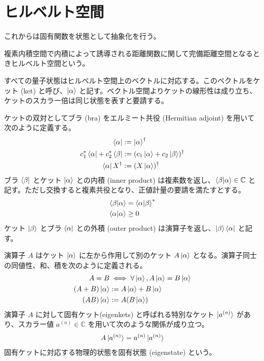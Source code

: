 \documentclass[uplatex,dvipdfmx,a4paper,11pt]{jlreq}
\newcommand{\CC}{\mathbb{C}}
\theoremstyle{definition}
\begin{document}
\section{ヒルベルト空間}
これからは固有関数を状態として抽象化を行う。
\begin{definition}
  複素内積空間で内積によって誘導される距離関数に関して完備距離空間となるときヒルベルト空間という。
\end{definition}
\begin{definition}[ブラケット]
  すべての量子状態はヒルベルト空間上のベクトルに対応する。このベクトルをケット (ket) と呼び、$\ket{\alpha}$ と記す。ベクトル空間よりケットの線形性は成り立ち、ケットのスカラー倍は同じ状態を表すと要請する。

  ケットの双対としてブラ (bra) をエルミート共役 (Hermitian adjoint) を用いて次のように定義する。
  \begin{align}
    \bra{\alpha}                         & := \ket{\alpha}^\dagger                       \\
    c_1^*\bra{\alpha} + c_2^*\bra{\beta} & := (c_1\ket{\alpha} + c_2\ket{\beta})^\dagger \\
    \bra{\alpha}X^\dagger                & := (X\ket{\alpha})^\dagger
  \end{align}
  ブラ $\bra{\beta}$ とケット $\ket{\alpha}$ との内積 (inner product) は複素数を返し、$\braket{\beta|\alpha}\in\CC$ と記す。ただし交換すると複素共役となり、正値計量の要請を満たすとする。
  \begin{align}
    \braket{\beta|\alpha}  & = \braket{\alpha|\beta}^* \\
    \braket{\alpha|\alpha} & \geq 0
  \end{align}
  ケット $\ket{\beta}$ とブラ $\bra{\alpha}$ との外積 (outer product) は演算子を返し、$\ket{\beta}\bra{\alpha}$ と記す。
\end{definition}

\begin{definition}[演算子]
  演算子 $A$ はケット $\ket{\alpha}$ に左から作用して別のケット $A\ket{\alpha}$ となる。演算子同士の同値性、和、積を次のように定義される。
  \begin{align}
    A = B               & \iff \forall \ket{\alpha}, A\ket{\alpha} = B\ket{\alpha} \\
    (A + B)\ket{\alpha} & := A\ket{\alpha} + B\ket{\alpha}                         \\
    (AB)\ket{\alpha}    & := A(B\ket{\alpha})
  \end{align}
  演算子 $A$ に対して固有ケット(eigenkets) と呼ばれる特別なケット $\ket{a^{(n)}}$ があり、スカラー値 $a^{(n)}\in\CC$ を用いて次のような関係が成り立つ。
  \begin{align}
    A\ket{a^{(n)}} = a^{(n)}\ket{a^{(n)}}
  \end{align}
  固有ケットに対応する物理的状態を固有状態 (eigenstate) という。
\end{definition}
\end{document}
